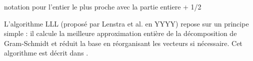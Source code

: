 \documentclass[a4paper,12pt]{report}  %
\theoremstyle{definitionstyle}
\theoremstyle{examplestyle}
\theoremstyle{remarkstyle}
\theoremstyle{propositionstyle}
\theoremstyle{theoremstyle}
\theoremstyle{proofstyle}
\begin{document}

notation pour l'entier le plus proche avec la partie entiere + 1/2	

L'algorithme LLL (proposé par Lenstra et al. en YYYY) repose sur un principe simple : il calcule la meilleure approximation entière de la décomposition de Gram-Schmidt et réduit la base en réorganisant les vecteurs si nécessaire. Cet algorithme est décrit dans \cite{MCA}.	
		
\end{document}
